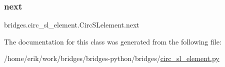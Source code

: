 \subsubsection{\texorpdfstring{next}{next}}
{\footnotesize\ttfamily bridges.\+circ\+\_\+sl\+\_\+element.\+Circ\+S\+Lelement.\+next}



The documentation for this class was generated from the following file\+:\begin{DoxyCompactItemize}
\item 
/home/erik/work/bridges/bridges-\/python/bridges/\hyperlink{circ__sl__element_8py}{circ\+\_\+sl\+\_\+element.\+py}\end{DoxyCompactItemize}
